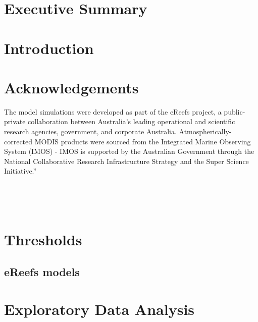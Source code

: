 \documentclass[a4paper]{AIMSreport}
\begin{document}


 
\section{Executive Summary}

\section{Introduction}



 


  

 


  


\section{Acknowledgements} 

The model simulations were developed as part of the eReefs project, a public-private collaboration
between Australia's leading operational and scientific research agencies, government, and corporate
Australia. Atmospherically-corrected MODIS products were sourced from the Integrated Marine
Observing System (IMOS) - IMOS is supported by the Australian Government through the National
Collaborative Research Infrastructure Strategy and the Super Science Initiative.”


~\\[2em]



~\\[2em]
\setcounter{table}{0}
\setcounter{figure}{0}
\renewcommand{\thetable}{\Alph{section}\arabic{table}}
\renewcommand{\thefigure}{\Alph{section}\arabic{figure}}
 
   
\section{Thresholds} 

\clearpage

 

\clearpage

\begin{landscape}       
\section{eReefs models}


\end{landscape}  
 
\clearpage 

\section{Exploratory Data Analysis}



 
\end{document}
